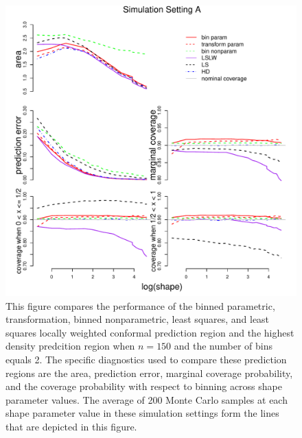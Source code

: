 \documentclass[11pt]{article}\usepackage[]{graphicx}\usepackage[]{color}
\makeatletter
\def\maxwidth{ %
  \ifdim\Gin@nat@width>\linewidth
    \linewidth
  \else
    \Gin@nat@width
  \fi
}
\newenvironment{knitrout}{}{} %
\makeatother
\begin{document}
\newpage
\begin{figure}[h!]
\begin{center}
\begin{knitrout}
\color{fgcolor}
\includegraphics[width=\maxwidth]{figure/Fig-gamma-150-1} 

\end{knitrout}
\end{center}
\caption{This figure compares the performance of the 
  binned parametric,
  transformation, 
  binned nonparametric,
  least squares, and 
  least squares locally weighted conformal prediction region and the 
  highest density predcition region when $n = 150$ and the number of bins 
  equals 2.  
  The specific diagnostics used to compare these prediction regions are the 
    area,
    prediction error, 
    marginal coverage probability,
    and the coverage probability with respect to binning  
    across shape parameter values.
  The average of 200 Monte Carlo samples at each shape parameter value in 
  these simulation settings form the lines that are depicted in this figure.}
\label{Fig:gamma.150}
\end{figure}
\end{document}
